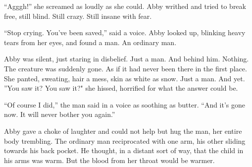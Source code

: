 ``Agggh!'' she screamed as loudly as she could. Abby writhed and
tried to break free, still blind. Still crazy. Still insane with
fear.



``Stop crying. You've been saved,'' said a voice. Abby
looked up, blinking heavy tears from her eyes, and found a man. An
ordinary man.



Abby was silent, just staring in disbelief. Just a man. And behind
him. Nothing. The creature was suddenly gone. As if it had never
been there in the first place. She panted, sweating, hair a mess,
skin as white as snow. Just a man. And yet. ''You saw it? You saw
it?" she hissed, horrified for what the answer could be.



``Of course I did,'' the man said in a voice as soothing
as butter. ``And it's gone now. It will never bother you
again.''



Abby gave a choke of laughter and could not help but hug the man,
her entire body trembling. The ordinary man reciprocated with one
arm, his other sliding towards his back pocket. He thought, in a
distant sort of way, that the child in his arms was warm. But the
blood from her throat would be warmer. 

 



